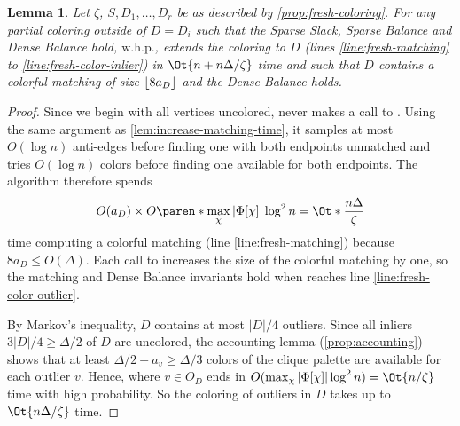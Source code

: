\documentclass[a4paper,english,11pt]{amsart}
\newtheorem{lemma}{Lemma}[section]
\theoremstyle{definition}
\renewcommand{\leq}{\leqslant}
\renewcommand{\geq}{\geqslant}
\DeclarePairedDelimiter{\paren}()
\DeclarePairedDelimiter{\floor}{\lfloor}{\rfloor}
\newcommand{\whp}{$\text{w.h.p.}$\xspace}
\begin{document}
\begin{lemma}
    \label{lem:fresh-dense}
    Let $\zeta$, $S, D_1, \ldots, D_r$ be as described by \cref{prop:fresh-coloring}. For any partial coloring outside of $D = D_i$ such that the Sparse Slack, Sparse Balance and Dense Balance hold, \whp, \FreshColoring extends the coloring to $D$ (lines \ref{line:fresh-matching} to \ref{line:fresh-color-inlier}) in $\Ot{ n + n\Delta/\zeta }$ time and such that $D$ contains a colorful matching of size $\floor{ 8 a_D }$ and the Dense Balance holds.
\end{lemma}

\begin{proof}
Since we begin with all vertices uncolored, \AddAntiEdgeMatching never makes a call to \RecolorDense. Using the same argument as \cref{lem:increase-matching-time}, it samples at most $O(\log n)$ anti-edges before finding one with both endpoints unmatched and tries $O(\log n)$ colors before finding one available for both endpoints. The algorithm therefore spends
\[
O(a_D) \times O\paren*{ \max_{\chi} |\Phi[\chi]| \log^2 n }
= \Ot*{\frac{n\Delta}{\zeta} }
\]
time computing a colorful matching (line \ref{line:fresh-matching}) because $8a_D \leq O(\Delta)$. Each call to \AddAntiEdgeMatching increases the size of the colorful matching by one, so the matching and Dense Balance invariants hold when \FreshColoring reaches line \ref{line:fresh-color-outlier}.

By Markov's inequality, $D$ contains at most $|D|/4$ outliers. Since all inliers $3|D|/4 \geq \Delta/2$ of $D$ are uncolored, the accounting lemma (\cref{prop:accounting}) shows that at least $\Delta / 2 - a_v \geq \Delta / 3$ colors of the clique palette are available for each outlier $v$. Hence,  where $v\in O_D$ ends in $O(\max_\chi |\Phi[\chi]|\log^2 n) = \Ot{ n/\zeta }$ time with high probability. So the coloring of outliers in $D$ takes up to $\Ot{ n\Delta/\zeta }$ time.


\end{proof}
\end{document}
